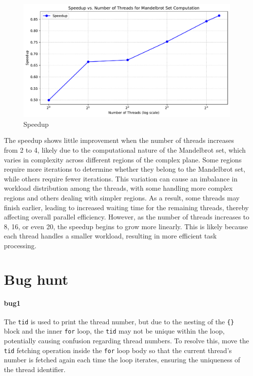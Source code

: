 \documentclass[unicode,11pt,a4paper,oneside,numbers=endperiod,openany]{scrartcl}
\begin{document}
\begin{figure}[h]
    \centering
    \includegraphics[width=1\textwidth]{pictures/speedup_plot.pdf}
    \caption{Speedup}
\end{figure}
The speedup shows little improvement when the number of threads increases from 2 to 4, likely due to the computational nature of the Mandelbrot set, which varies in complexity across different regions of the complex plane. Some regions require more iterations to determine whether they belong to the Mandelbrot set, while others require fewer iterations. This variation can cause an imbalance in workload distribution among the threads, with some handling more complex regions and others dealing with simpler regions. As a result, some threads may finish earlier, leading to increased waiting time for the remaining threads, thereby affecting overall parallel efficiency. However, as the number of threads increases to 8, 16, or even 20, the speedup begins to grow more linearly. This is likely because each thread handles a smaller workload, resulting in more efficient task processing.

\section{Bug hunt }
\paragraph{bug1}
The \texttt{tid} is used to print the thread number, but due to the nesting of the \texttt{\{\}} block and the inner \texttt{for} loop, the \texttt{tid} may not be unique within the loop, potentially causing confusion regarding thread numbers. To resolve this, move the \texttt{tid} fetching operation inside the \texttt{for} loop body so that the current thread's number is fetched again each time the loop iterates, ensuring the uniqueness of the thread identifier.
\end{document}
